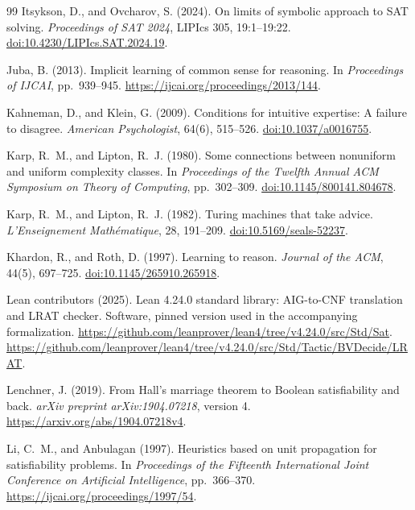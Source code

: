 \documentclass[11pt,a4paper]{article}
\numberwithin{equation}{section}
\theoremstyle{plain}
\theoremstyle{definition}
\theoremstyle{remark}
\begin{document}
\begin{thebibliography}{99}
Itsykson, D., and Ovcharov, S. (2024).
On limits of symbolic approach to SAT solving.
\emph{Proceedings of SAT 2024}, LIPIcs 305, 19:1--19:22.
\href{https://doi.org/10.4230/LIPIcs.SAT.2024.19}{doi:10.4230/LIPIcs.SAT.2024.19}.

Juba, B. (2013).
Implicit learning of common sense for reasoning.
In \emph{Proceedings of IJCAI}, pp.~939--945.
\url{https://ijcai.org/proceedings/2013/144}.

Kahneman, D., and Klein, G. (2009).
Conditions for intuitive expertise: A failure to disagree.
\emph{American Psychologist}, 64(6), 515--526.
\href{https://doi.org/10.1037/a0016755}{doi:10.1037/a0016755}.

Karp, R.~M., and Lipton, R.~J. (1980).
Some connections between nonuniform and uniform complexity classes.
In \emph{Proceedings of the Twelfth Annual ACM Symposium on Theory of Computing}, pp.~302--309.
\href{https://doi.org/10.1145/800141.804678}{doi:10.1145/800141.804678}.

Karp, R.~M., and Lipton, R.~J. (1982).
Turing machines that take advice.
\emph{L'Enseignement Math\'ematique}, 28, 191--209.
\href{https://doi.org/10.5169/seals-52237}{doi:10.5169/seals-52237}.

Khardon, R., and Roth, D. (1997).
Learning to reason.
\emph{Journal of the ACM}, 44(5), 697--725.
\href{https://doi.org/10.1145/265910.265918}{doi:10.1145/265910.265918}.

Lean contributors (2025).
Lean 4.24.0 standard library: AIG-to-CNF translation and LRAT checker.
Software, pinned version used in the accompanying formalization.
\url{https://github.com/leanprover/lean4/tree/v4.24.0/src/Std/Sat}.
\url{https://github.com/leanprover/lean4/tree/v4.24.0/src/Std/Tactic/BVDecide/LRAT}.

Lenchner, J. (2019).
From Hall's marriage theorem to Boolean satisfiability and back.
\emph{arXiv preprint arXiv:1904.07218}, version 4.
\url{https://arxiv.org/abs/1904.07218v4}.

Li, C.~M., and Anbulagan (1997).
Heuristics based on unit propagation for satisfiability problems.
In \emph{Proceedings of the Fifteenth International Joint Conference on Artificial Intelligence}, pp.~366--370.
\url{https://ijcai.org/proceedings/1997/54}.


\end{thebibliography}
\end{document}

